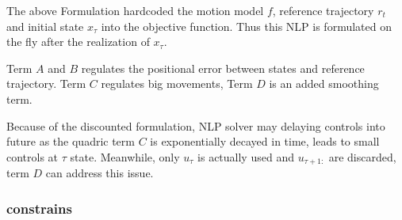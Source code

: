 \documentclass[conference]{IEEEtran}
\begin{document}
The above Formulation hardcoded the motion model $f$, reference trajectory $r_t$ 
and initial state $x_\tau$ into the objective function. Thus this 
NLP is formulated on the fly after the realization of $x_\tau$.

Term $A$ and $B$ regulates the positional error between states and reference trajectory.
Term $C$ regulates big movements, Term $D$ is an added smoothing term.

Because of the discounted formulation, NLP solver may
delaying controls into future as the quadric term $C$ is exponentially decayed in time,
leads to small controls at $\tau$ state.
Meanwhile, only $u_\tau$ is actually used and $u_{\tau+1:}$ are discarded,
term $D$ can address this issue.

\subsubsection{constrains}
\end{document}
